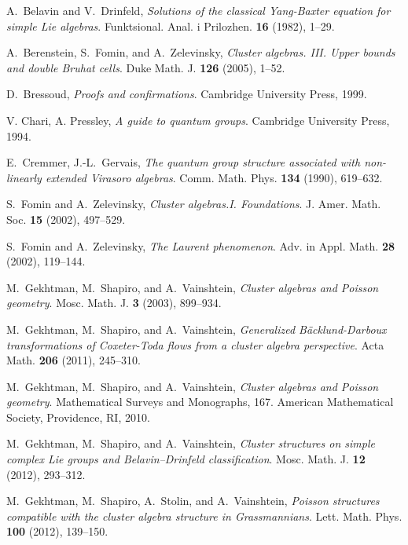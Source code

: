 \documentclass{amsart}
\theoremstyle{definition}
\theoremstyle{remark}
\numberwithin{equation}{section}
\numberwithin{theorem}{section}
\begin{document}
\begin{thebibliography}{GSV7}

 A.~Belavin and V.~Drinfeld,
\textit{Solutions of the classical Yang-Baxter equation for simple Lie algebras}.
Funktsional. Anal. i Prilozhen. {\bf16} (1982), 1--29.

  A.~Berenstein, S.~Fomin, and A.~Zelevinsky,
\textit{Cluster algebras. III. Upper bounds and double Bruhat cells}. 
Duke Math. J. \textbf{126} (2005), 1--52.

 D.~Bressoud,
\textit{Proofs and confirmations}.
Cambridge University Press, 1999.

 V. Chari, A. Pressley, 
\textit{A guide to quantum groups}. 
Cambridge University Press, 1994.

 E.~Cremmer, J.-L.~Gervais,
\textit{The quantum group structure associated with non-linearly extended Virasoro algebras}.
Comm. Math. Phys. {\bf 134} (1990), 619--632.

  S.~Fomin and A.~Zelevinsky, 
\textit{Cluster algebras.I. Foundations}. 
J. Amer. Math. Soc. \textbf{15} (2002), 497--529.

 S.~Fomin and A.~Zelevinsky, 
\textit{The Laurent phenomenon}.
Adv. in Appl. Math. {\bf 28} (2002), 119--144.

  M.~Gekhtman, M.~Shapiro, and A.~Vainshtein,
\textit{Cluster algebras and Poisson geometry}.  
Mosc. Math. J. \textbf{3} (2003), 899--934.

  M.~Gekhtman, M.~Shapiro, and A.~Vainshtein, 
\textit{Generalized B\"acklund-Darboux transformations of Coxeter-Toda flows from a cluster algebra perspective}.
Acta Math. {\bf 206} (2011), 245--310.

  M.~Gekhtman, M.~Shapiro, and A.~Vainshtein,
\textit{Cluster algebras and Poisson geometry}.
Mathematical Surveys and Monographs, 167. American Mathematical Society, Providence, RI, 2010.

  M.~Gekhtman, M.~Shapiro, and A.~Vainshtein,
\textit{Cluster structures on simple complex Lie groups and Belavin--Drinfeld classification}. 
Mosc. Math. J. \textbf{12} (2012), 293--312.

 M.~Gekhtman, M.~Shapiro, A.~Stolin, and A.~Vainshtein,
\textit{Poisson structures compatible with the cluster algebra structure in Grassmannians}.
Lett. Math. Phys. {\bf 100} (2012), 139--150. 


\end{thebibliography}
\end{document}
